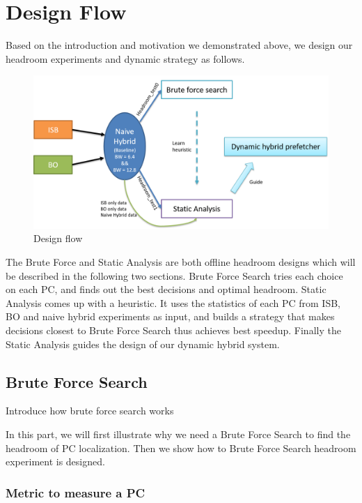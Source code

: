 \section{Design Flow}
\label{sec:designflow}

Based on the introduction and motivation we demonstrated above, we design our headroom experiments and dynamic strategy as follows. 


\begin{figure}[ht!]
	\centering
	\includegraphics[width=1.0\textwidth]{images/design_flow.png}
	\caption{Design flow}
	\label{fig:design_flow}
\end{figure}

The Brute Force and Static Analysis are both offline headroom designs which will be described in the following two sections. 
Brute Force Search tries each choice on each PC, and finds out the best decisions and optimal headroom. 
Static Analysis comes up with a heuristic. It uses the statistics of each PC from ISB, BO and naive hybrid experiments as input, and builds a strategy that makes decisions closest to Brute Force Search thus achieves best speedup. 
Finally the Static Analysis guides the design of our dynamic hybrid system.


  \subsection{Brute Force Search}
  \label{sec:bruteforcesearch}
  
  Introduce how brute force search works \par
  In this part, we will first illustrate why we need a Brute Force Search to find the headroom of PC localization. Then we show how to Brute Force Search headroom experiment is designed. \par
  
  \subsubsection{Metric to measure a PC}
  \label{sec:metricPC}
  
